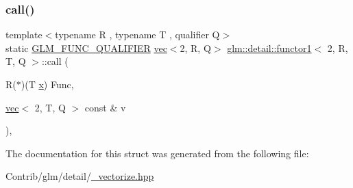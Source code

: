 \subsubsection{\texorpdfstring{call()}{call()}}
{\footnotesize\ttfamily template$<$typename R , typename T , qualifier Q$>$ \\
static \mbox{\hyperlink{setup_8hpp_a33fdea6f91c5f834105f7415e2a64407}{G\+L\+M\+\_\+\+F\+U\+N\+C\+\_\+\+Q\+U\+A\+L\+I\+F\+I\+ER}} \mbox{\hyperlink{structglm_1_1vec}{vec}}$<$2, R, Q$>$ \mbox{\hyperlink{structglm_1_1detail_1_1functor1}{glm\+::detail\+::functor1}}$<$ 2, R, T, Q $>$\+::call (\begin{DoxyParamCaption}\item[{R($\ast$)(T \mbox{\hyperlink{_s_d_l__opengl_8h_ad0e63d0edcdbd3d79554076bf309fd47}{x}})}]{Func,  }\item[{\mbox{\hyperlink{structglm_1_1vec}{vec}}$<$ 2, T, Q $>$ const \&}]{v }\end{DoxyParamCaption})\hspace{0.3cm}{\ttfamily [inline]}, {\ttfamily [static]}}



The documentation for this struct was generated from the following file\+:\begin{DoxyCompactItemize}
\item 
Contrib/glm/detail/\mbox{\hyperlink{__vectorize_8hpp}{\+\_\+vectorize.\+hpp}}\end{DoxyCompactItemize}
